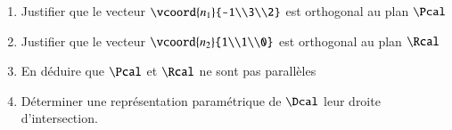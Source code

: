 \documentclass[oneside,12pt]{article}          %
\begin{document}
\begin{enumerate}
    \item Justifier que le vecteur $\vcoord{n_1}{-1\\3\\2}$ est orthogonal au plan $\Pcal$
    \item Justifier que le vecteur $\vcoord{n_2}{1\\1\\0}$ est orthogonal au plan $\Rcal$
    \item En déduire que $\Pcal$ et $\Rcal$ ne sont pas parallèles
    \item Déterminer une représentation paramétrique de $\Dcal$ leur droite d'intersection.
\end{enumerate}
\end{document}
